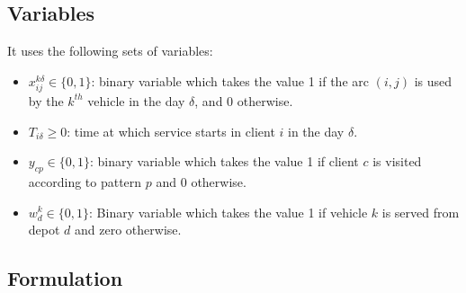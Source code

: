 \documentclass[preprint,review,12pt]{elsarticle}
\begin{document}

\subsection{Variables}
It uses the following sets of variables:

\begin{itemize}
	\item  $x_{ij}^{k\delta}  \in  \{ 0,1 \}$: binary variable which takes the value 1 if the arc $(i,j)$ is used by the $k^{th}$ vehicle in the day $\delta$, and 0 otherwise. 
	\item $T_{i\delta} \geq 0$: time at which service starts in client $i$ in the day $\delta$. 
	\item $y_{cp} \in  \{ 0,1 \}$: binary variable which takes the value 1 if client $c$ is visited according to pattern $p$ and 0 otherwise.
	\item  $w_d^k \in  \{0,1\}$: Binary variable which takes the value 1 if vehicle $k$ is served from depot $d$ and zero otherwise.
\end{itemize}

\subsection{Formulation}
\end{document}

